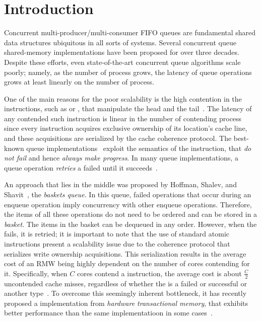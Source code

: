 \section{Introduction}

Concurrent multi-producer/multi-consumer FIFO queues are fundamental shared data structures ubiquitous in all sorts of systems. Several concurrent queue shared-memory implementations have been proposed for over three decades. Despite these efforts, even state-of-the-art concurrent queue algorithms scale poorly; namely, as the number of process grows, the latency of queue operations grows at least linearly on the number of process.

One of the main reasons for the poor scalability is the high contention in the \RMW instructions, such as \CAS or \FAI, that manipulate the head and the tail~\cite{DBLP_conf_spaa_FatourouK11, DBLP_conf_ppopp_FatourouK12, basketqueue2007, DBLP_conf_ppopp_KoganP11, DBLP_journals_dc_Ladan-MozesS08, DBLP_conf_podc_MichaelS96, DBLP_journals_topc_Milman-SelaKLLP22, ppopp2013x86queues, scalingconcurrent2020, DBLP_conf_ppopp_YangM16}. The latency of any contended such instruction is linear in the number of contending process since every instruction acquires exclusive ownership of its location’s cache line, and these acquisitions are serialized by the cache coherence protocol. The best-known queue implementations~\cite{ppopp2013x86queues, DBLP_conf_ppopp_YangM16} exploit the semantics of the \FAI instruction, that \emph{do not fail} and hence \emph{always make progress}.  In many queue implementations, a queue operation \emph{retries} a failed \CAS{} until it succeeds~\cite{DBLP_conf_spaa_FatourouK11, DBLP_conf_ppopp_FatourouK12, DBLP_conf_ppopp_KoganP11, DBLP_journals_dc_Ladan-MozesS08, DBLP_conf_podc_MichaelS96, DBLP_journals_topc_Milman-SelaKLLP22}.

An approach that lies in the middle was proposed by Hoffman, Shalev, and Shavit~\cite{basketqueue2007}, the \emph{baskets queue}. In this queue, failed \CAS{} operations that occur during an enqueue operation imply concurrency with other enqueue operations. Therefore, the items of all these operations do not need to be ordered and can be stored in a \emph{basket}. The items in the basket can be dequeued in any order. However, when the \CAS{} fails, it is retried; it is important to note that the use of standard atomic \RMW{} instructions present a scalability issue due to the coherence protocol that serializes write ownership acquisitions. This serialization results in the average cost of an RMW being highly dependent on the number of cores contending for it. Specifically, when \(C\) cores contend a \RMW{} instruction, the average cost is about \(\frac{C}{2}\) uncontended cache misses, regardless of whether the \RMW{} is a failed or successful \CAS{} or another \RMW{} type~\cite{scalingconcurrent2020}. To overcome this seemingly inherent bottleneck, it has recently proposed a \CAS{} implementation from \emph{hardware transactional memory}, that exhibits better performance than the same \CAS{} implementatioon in some cases~\cite{scalingconcurrent2020}.

